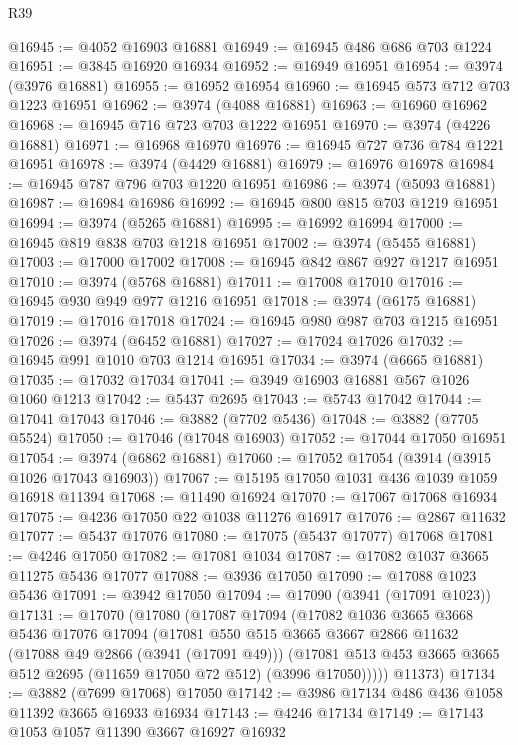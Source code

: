 \begin{lexlean}{R39}
\begin{coremodule}
@16945 := @4052 @16903 @16881
@16949 := @16945 @486 @686 @703 @1224
@16951 := @3845 @16920 @16934
@16952 := @16949 @16951
@16954 := @3974 (@3976 @16881)
@16955 := @16952 @16954
@16960 := @16945 @573 @712 @703 @1223 @16951
@16962 := @3974 (@4088 @16881)
@16963 := @16960 @16962
@16968 := @16945 @716 @723 @703 @1222 @16951
@16970 := @3974 (@4226 @16881)
@16971 := @16968 @16970
@16976 := @16945 @727 @736 @784 @1221 @16951
@16978 := @3974 (@4429 @16881)
@16979 := @16976 @16978
@16984 := @16945 @787 @796 @703 @1220 @16951
@16986 := @3974 (@5093 @16881)
@16987 := @16984 @16986
@16992 := @16945 @800 @815 @703 @1219 @16951
@16994 := @3974 (@5265 @16881)
@16995 := @16992 @16994
@17000 := @16945 @819 @838 @703 @1218 @16951
@17002 := @3974 (@5455 @16881)
@17003 := @17000 @17002
@17008 := @16945 @842 @867 @927 @1217 @16951
@17010 := @3974 (@5768 @16881)
@17011 := @17008 @17010
@17016 := @16945 @930 @949 @977 @1216 @16951
@17018 := @3974 (@6175 @16881)
@17019 := @17016 @17018
@17024 := @16945 @980 @987 @703 @1215 @16951
@17026 := @3974 (@6452 @16881)
@17027 := @17024 @17026
@17032 := @16945 @991 @1010 @703 @1214 @16951
@17034 := @3974 (@6665 @16881)
@17035 := @17032 @17034
@17041 := @3949 @16903 @16881 @567 @1026 @1060 @1213
@17042 := @5437 @2695
@17043 := @5743 @17042
@17044 := @17041 @17043
@17046 := @3882 (@7702 @5436)
@17048 := @3882 (@7705 @5524)
@17050 := @17046 (@17048 @16903)
@17052 := @17044 @17050 @16951
@17054 := @3974 (@6862 @16881)
@17060 := @17052 @17054 (@3914 (@3915 @1026 @17043 @16903))
@17067 := @15195 @17050 @1031 @436 @1039 @1059 @16918 @11394
@17068 := @11490 @16924
@17070 := @17067 @17068 @16934
@17075 := @4236 @17050 @22 @1038 @11276 @16917
@17076 := @2867 @11632
@17077 := @5437 @17076
@17080 := @17075 (@5437 @17077) @17068
@17081 := @4246 @17050
@17082 := @17081 @1034
@17087 := @17082 @1037 @3665 @11275 @5436 @17077
@17088 := @3936 @17050
@17090 := @17088 @1023 @5436
@17091 := @3942 @17050
@17094 := @17090 (@3941 (@17091 @1023))
@17131 := @17070
    (@17080
      (@17087
        @17094
        (@17082
          @1036
          @3665
          @3668
          @5436
          @17076
          @17094
          (@17081
            @550
            @515
            @3665
            @3667
            @2866
            @11632
            (@17088 @49 @2866 (@3941 (@17091 @49)))
            (@17081 @513 @453 @3665 @3665 @512 @2695 (@11659 @17050 @72 @512) (@3996 @17050)))))
      @11373)
@17134 := @3882 (@7699 @17068) @17050
@17142 := @3986 @17134 @486 @436 @1058 @11392 @3665 @16933 @16934
@17143 := @4246 @17134
@17149 := @17143 @1053 @1057 @11390 @3667 @16927 @16932

\end{coremodule}
\end{lexlean}
